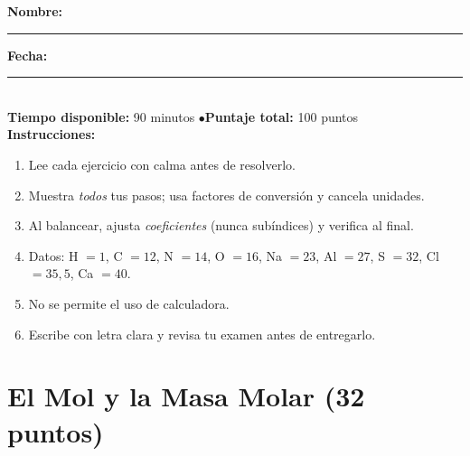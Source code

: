 \documentclass[12pt, letterpaper]{article}
\begin{document}


\vspace{4pt}
\begin{cuadroinfo}
  \small
  \textbf{Nombre:} \rule{0.55\linewidth}{0.4pt} \quad \textbf{Fecha:} \rule{0.15\linewidth}{0.4pt} \\[6pt]
  \textbf{Tiempo disponible:} 90 minutos \quad$\bullet$\quad \textbf{Puntaje total:} 100 puntos \\[4pt]
  \textbf{Instrucciones:}
  \begin{enumerate}[leftmargin=*]
    \item Lee cada ejercicio con calma antes de resolverlo.
    \item Muestra \emph{todos} tus pasos; usa factores de conversión y cancela unidades.
    \item Al balancear, ajusta \emph{coeficientes} (nunca subíndices) y verifica al final.
    \item Datos: H $= 1$, C $= 12$, N $= 14$, O $= 16$, Na $= 23$, Al $= 27$, S $= 32$, Cl $= 35{,}5$, Ca $= 40$.
    \item No se permite el uso de calculadora.
    \item Escribe con letra clara y revisa tu examen antes de entregarlo.
  \end{enumerate}
\end{cuadroinfo}

\vspace{8pt}

\section{El Mol y la Masa Molar (32 puntos)}
\end{document}

